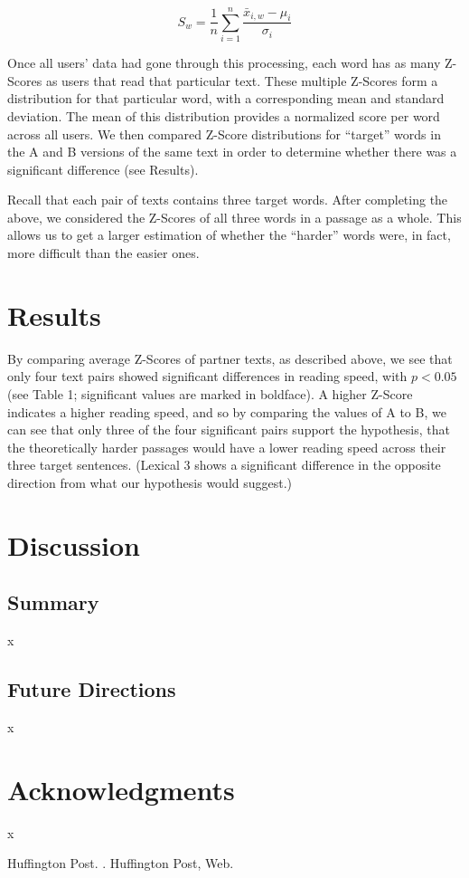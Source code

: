 \documentclass[11pt,letterpaper]{article}
\begin{document}
	\[ S_w = \frac1n \sum_{i=1}^n \frac{\bar{x}_{i,w} - \mu_i}{\sigma_i} \]
	
	Once all users' data had gone through this processing, each word has as many Z-Scores as users that read that particular text. These multiple Z-Scores form a distribution for that particular word, with a corresponding mean and standard deviation. The mean of this distribution provides a normalized score per word across all users. We then compared Z-Score distributions for ``target'' words in the A and B versions of the same text in order to determine whether there was a significant difference (see Results). 
	
	Recall that each pair of texts contains three target words. After completing the above, we considered the Z-Scores of all three words in a passage as a whole. This allows us to get a larger estimation of whether the ``harder'' words were, in fact, more difficult than the easier ones.
	
	
	\section{Results}
	
	By comparing average Z-Scores of partner texts, as described above, we see that only four text pairs showed significant differences in reading speed, with $p < 0.05$  (see Table 1; significant values are marked in boldface). A higher Z-Score indicates a higher reading speed, and so by comparing the values of A to B, we can see that only three of the four significant pairs support the hypothesis, that the theoretically harder passages would have a lower reading speed across their three target sentences. (Lexical 3 shows a significant difference in the opposite direction from what our hypothesis would suggest.)
	
	\section{Discussion}
	
	\subsection{Summary}
	
	x
	
	\subsection{Future Directions}
	
	x
	
	\section*{Acknowledgments}
	
	x
	
	\begin{thebibliography}{}
		
		{Huffington Post}.
		.
		\newblock Huffington Post, Web.
		
	\end{thebibliography}
	
\end{document}
